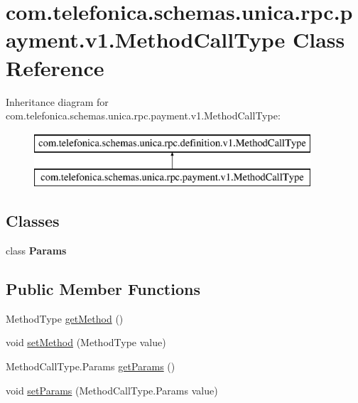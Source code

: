 \hypertarget{classcom_1_1telefonica_1_1schemas_1_1unica_1_1rpc_1_1payment_1_1v1_1_1MethodCallType}{
\section{com.telefonica.schemas.unica.rpc.payment.v1.MethodCallType Class Reference}
\label{classcom_1_1telefonica_1_1schemas_1_1unica_1_1rpc_1_1payment_1_1v1_1_1MethodCallType}
}
Inheritance diagram for com.telefonica.schemas.unica.rpc.payment.v1.MethodCallType:\begin{figure}[H]
\begin{center}
\leavevmode
\includegraphics[height=2.000000cm]{classcom_1_1telefonica_1_1schemas_1_1unica_1_1rpc_1_1payment_1_1v1_1_1MethodCallType}
\end{center}
\end{figure}
\subsection*{Classes}
\begin{DoxyCompactItemize}
\item 
class {\bfseries Params}
\end{DoxyCompactItemize}
\subsection*{Public Member Functions}
\begin{DoxyCompactItemize}
\item 
MethodType \hyperlink{classcom_1_1telefonica_1_1schemas_1_1unica_1_1rpc_1_1payment_1_1v1_1_1MethodCallType_aef44db8ba0c9bab233b06574f79d0394}{getMethod} ()
\item 
void \hyperlink{classcom_1_1telefonica_1_1schemas_1_1unica_1_1rpc_1_1payment_1_1v1_1_1MethodCallType_a10d59031555a12400befd0407dac67ec}{setMethod} (MethodType value)
\item 
MethodCallType.Params \hyperlink{classcom_1_1telefonica_1_1schemas_1_1unica_1_1rpc_1_1payment_1_1v1_1_1MethodCallType_a011d77711ab18ba4d97eee0d02d6cf02}{getParams} ()
\item 
void \hyperlink{classcom_1_1telefonica_1_1schemas_1_1unica_1_1rpc_1_1payment_1_1v1_1_1MethodCallType_a67402b2a3bc0e318f97518f64327a46a}{setParams} (MethodCallType.Params value)
\end{DoxyCompactItemize}
